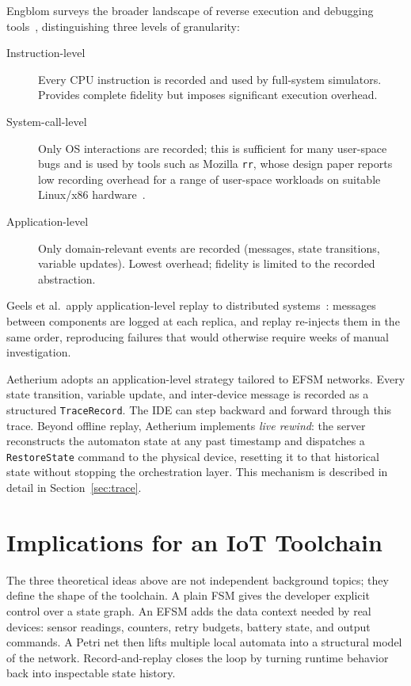 Engblom surveys the broader landscape of reverse execution and debugging
tools~\cite{Engblom2012}, distinguishing three levels of granularity:
\begin{description}
  \item[Instruction-level] Every CPU instruction is recorded and used by full-system
    simulators.  Provides complete fidelity but imposes significant execution overhead.
  \item[System-call-level] Only OS interactions are recorded; this is sufficient for many
    user-space bugs and is used by tools such as Mozilla \texttt{rr}, whose design paper
    reports low recording overhead for a range of user-space workloads on suitable
    Linux/x86 hardware~\cite{OCallahan2016RR}.
  \item[Application-level] Only domain-relevant events are recorded (messages, state
    transitions, variable updates).  Lowest overhead; fidelity is limited to the recorded
    abstraction.
\end{description}

Geels et al.\ apply application-level replay to distributed systems~\cite{Geels2006}:
messages between components are logged at each replica, and replay re-injects them in the
same order, reproducing failures that would otherwise require weeks of manual investigation.

Aetherium adopts an application-level strategy tailored to EFSM networks.  Every state
transition, variable update, and inter-device message is recorded as a structured
\texttt{TraceRecord}.  The IDE can step backward and forward through this trace.  Beyond
offline replay, Aetherium implements \textit{live rewind}: the server reconstructs the
automaton state at any past timestamp and dispatches a \texttt{RestoreState} command to
the physical device, resetting it to that historical state without stopping the
orchestration layer.  This mechanism is described in detail in Section~\ref{sec:trace}.

\section{Implications for an IoT Toolchain}
\label{sec:background-implications}

The three theoretical ideas above are not independent background topics; they define the shape of the toolchain. A plain FSM gives the developer explicit control over a state graph. An EFSM adds the data context needed by real devices: sensor readings, counters, retry budgets, battery state, and output commands. A Petri net then lifts multiple local automata into a structural model of the network. Record-and-replay closes the loop by turning runtime behavior back into inspectable state history.

